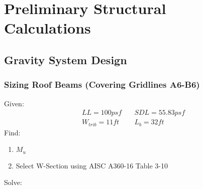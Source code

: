 \documentclass{report} %
\begin{document}
\newpage
\section*{Preliminary Structural Calculations}
\subsection*{Gravity System Design}
\subsubsection*{Sizing Roof Beams (Covering Gridlines A6-B6)}
Given:
\begin{equation*}
    \begin{aligned}
        &LL = 100psf &\quad SDL = 55.83psf \\
        &W_{trib} = 11ft &\quad L_b = 32ft 
    \end{aligned}
\end{equation*}
Find: 
\begin{enumerate}
    \item $M_u$
    \item Select W-Section using AISC A360-16 Table 3-10
\end{enumerate}
Solve: 
\end{document}
